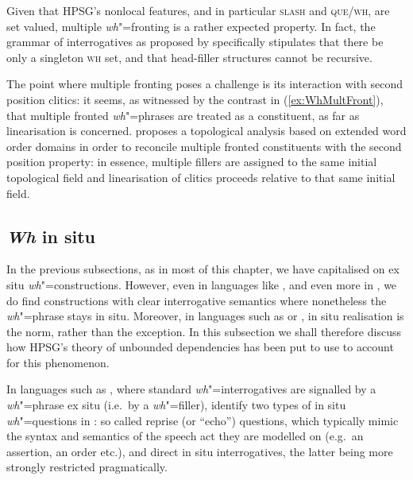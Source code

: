 \documentclass[output=paper
,notxmath 
 	        ,biblatex
                ,babelshorthands
                ,newtxmath
                ,draftmode
                ,colorlinks, citecolor=brown
]{langscibook}
\begin{document}
\noindent
Given that HPSG's nonlocal features, and in particular \textsc{slash}
and \textsc{que}/\textsc{wh}, are set valued, multiple \emph{wh}"=fronting is a
rather expected property. In fact, the grammar of 
interrogatives as proposed by \citet{Ginzburg:Sag:01} specifically
stipulates that there be only a singleton \textsc{wh} set, and that
head-filler structures cannot be recursive.

The point where  multiple fronting poses a challenge is its
interaction with second position clitics: it seems, as witnessed by
the contrast in (\ref{ex:WhMultFront}), that multiple fronted
\emph{wh}"=phrases are treated as a constituent, as far as
linearisation is concerned. \citet{Penn:99} proposes a topological
analysis based on extended word order domains
\citep{Reape:90,kathol_a00} in order to reconcile multiple fronted
constituents with the second position property: in essence, multiple
fillers are assigned to the same initial topological field and
linearisation of clitics proceeds relative to that same initial field.


\subsection{\emph{Wh} in situ}
\label{sec:UDC:WhInSitu}

In the previous subsections, as in most of this chapter, we have
capitalised on ex situ \emph{wh}"=constructions. However, even in
languages like , and even more in , we do find
constructions with clear interrogative semantics where nonetheless the
\emph{wh}"=phrase stays in situ. Moreover, in languages such as
 or  , in situ realisation is the norm, rather
than the exception. In this subsection we shall therefore discuss how
HPSG's theory of unbounded dependencies has been put to use to account
for this phenomenon.

In languages such as , where standard \emph{wh}"=interrogatives
are signalled by a \emph{wh}"=phrase ex situ (i.e.\ by a
\emph{wh}"=filler), \citet[Chapter~7]{Ginzburg:Sag:01} identify two types of in
situ \emph{wh}"=questions in : so called reprise (or ``echo'')
questions, which typically mimic the syntax and semantics of the
speech act they are modelled on (e.g.\ an assertion, an order etc.),
and direct in situ interrogatives, the latter being more strongly
restricted
pragmatically. %
\end{document}
